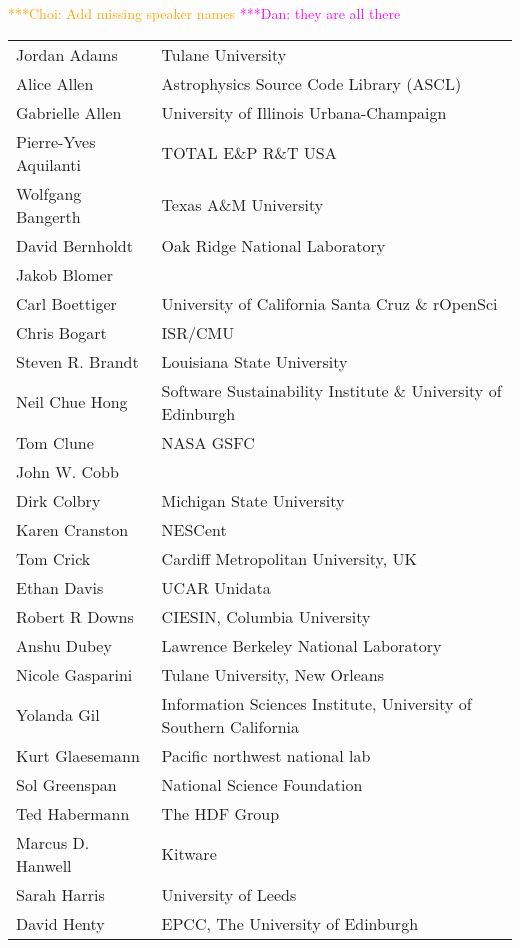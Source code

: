 \documentclass[11pt, oneside]{amsart}
\newcommand{\katznote}[1]{ {\textcolor{magenta}    { ***Dan:      #1 }}}
\newcommand{\choinote}[1]{ {\textcolor{orange}    {***Choi: #1 }}}
\begin{document}
\choinote{Add missing speaker names} \katznote{they are all there}


{\small
\begin{longtable}{ll}
   Jordan Adams          &  Tulane University
\\ Alice Allen           &  Astrophysics Source Code Library (ASCL)
\\ Gabrielle Allen       & University of Illinois Urbana-Champaign
\\ Pierre-Yves Aquilanti &  TOTAL E\&P R\&T USA
\\ Wolfgang Bangerth & Texas A\&M University
\\ David Bernholdt       &  Oak Ridge National Laboratory
\\ Jakob Blomer
\\ Carl Boettiger        &  University of California Santa Cruz \& rOpenSci
\\ Chris Bogart          &  ISR/CMU
\\ Steven R. Brandt      &  Louisiana State University
\\ Neil Chue Hong        &  Software Sustainability Institute \& University of Edinburgh
\\ Tom Clune             &  NASA GSFC
\\ John W. Cobb
\\ Dirk Colbry           &  Michigan State University
\\ Karen Cranston        &  NESCent
\\ Tom Crick             &  Cardiff Metropolitan University, UK
\\ Ethan Davis           &  UCAR Unidata
\\ Robert R Downs        &  CIESIN, Columbia University
\\ Anshu Dubey           &  Lawrence Berkeley National Laboratory
\\ Nicole Gasparini      &  Tulane University, New Orleans
\\ Yolanda Gil           &  Information Sciences Institute, University of Southern California
\\ Kurt Glaesemann       &  Pacific northwest national lab
\\ Sol Greenspan         &  National Science Foundation
\\ Ted Habermann         &  The HDF Group
\\ Marcus D. Hanwell     &  Kitware
\\ Sarah Harris          &  University of Leeds
\\ David Henty           &  EPCC, The University of Edinburgh

\end{longtable}}
\end{document}
